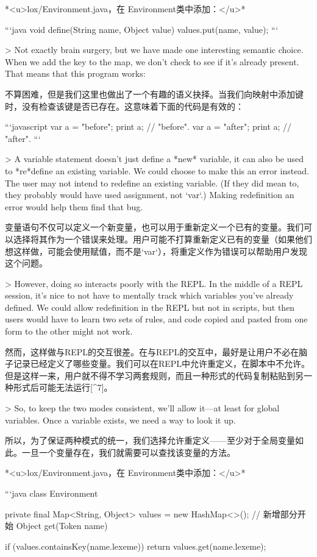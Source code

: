 \documentclass[cn,11pt,chinese]{elegantbook}
\begin{document}
{{{*<u>lox/Environment.java，在 Environment类中添加：</u>*

```java
  void define(String name, Object value) {
    values.put(name, value);
  }
```

> Not exactly brain surgery, but we have made one interesting semantic choice. When we add the key to the map, we don’t check to see if it’s already present. That means that this program works:

不算困难，但是我们这里也做出了一个有趣的语义抉择。当我们向映射中添加键时，没有检查该键是否已存在。这意味着下面的代码是有效的：

```javascript
var a = "before";
print a; // "before".
var a = "after";
print a; // "after".
```

> A variable statement doesn’t just define a *new* variable, it can also be used to *re*define an existing variable. We could choose to make this an error instead. The user may not intend to redefine an existing variable. (If they did mean to, they probably would have used assignment, not `var`.) Making redefinition an error would help them find that bug.

变量语句不仅可以定义一个新变量，也可以用于重新定义一个已有的变量。我们可以选择将其作为一个错误来处理。用户可能不打算重新定义已有的变量（如果他们想这样做，可能会使用赋值，而不是`var`），将重定义作为错误可以帮助用户发现这个问题。

> However, doing so interacts poorly with the REPL. In the middle of a REPL session, it’s nice to not have to mentally track which variables you’ve already defined. We could allow redefinition in the REPL but not in scripts, but then users would have to learn two sets of rules, and code copied and pasted from one form to the other might not work.

然而，这样做与REPL的交互很差。在与REPL的交互中，最好是让用户不必在脑子记录已经定义了哪些变量。我们可以在REPL中允许重定义，在脚本中不允许。但是这样一来，用户就不得不学习两套规则，而且一种形式的代码复制粘贴到另一种形式后可能无法运行[^7]。

> So, to keep the two modes consistent, we’ll allow it—at least for global variables. Once a variable exists, we need a way to look it up.

所以，为了保证两种模式的统一，我们选择允许重定义——至少对于全局变量如此。一旦一个变量存在，我们就需要可以查找该变量的方法。

*<u>lox/Environment.java，在 Environment类中添加：</u>*

```java
class Environment {
  private final Map<String, Object> values = new HashMap<>();
  // 新增部分开始
  Object get(Token name) {
    if (values.containsKey(name.lexeme)) {
      return values.get(name.lexeme);
    }

}}}}}
\end{document}
